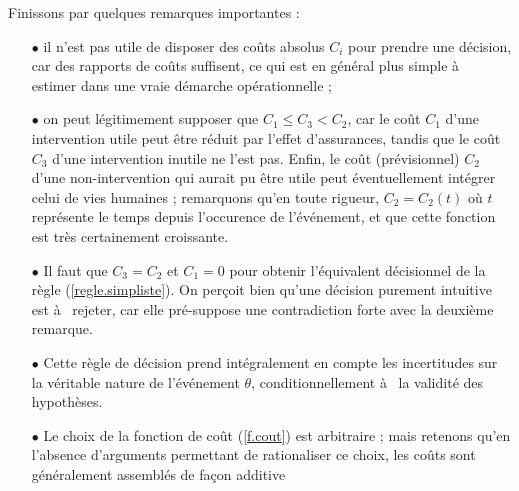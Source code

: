 

\vspace{1cm}

Finissons par quelques remarques importantes :
\begin{itemize}
\item[$\bullet$] il n'est pas utile de disposer des coûts absolus $C_i$ pour prendre une décision, car des rapports de coûts suffisent, ce qui est en général plus simple à  estimer dans une vraie démarche opérationnelle ;
\item[$\bullet$] on peut légitimement supposer que $C_1\leq  C_3 < C_2$, car le coût $C_1$ d'une intervention utile peut être réduit par l'effet d'assurances, tandis que le coût $C_3$ d'une intervention inutile ne l'est pas. Enfin, le coût (prévisionnel) $C_2$ d'une non-intervention qui aurait pu être utile peut éventuellement intégrer celui de vies humaines ; remarquons qu'en toute rigueur, $C_2=C_2(t)$ où $t$ représente le temps depuis l'occurence de l'événement, et que cette fonction est très certainement croissante. 
\item[$\bullet$] Il faut que $C_3=C_2$ et $C_1=0$ pour obtenir l'équivalent décisionnel de la règle (\ref{regle.simpliste}). On per\c coit bien qu'une décision purement intuitive est à  rejeter, car elle pré-suppose une contradiction forte avec la deuxième remarque.
\item[$\bullet$] Cette règle de décision prend intégralement en compte les incertitudes sur la véritable nature de l'événement $\theta$, conditionnellement à  la validité des hypothèses. 
\item[$\bullet$] Le choix de la fonction de coût (\ref{f.cout}) est arbitraire ; mais retenons qu'en l'absence d'arguments permettant de rationaliser ce choix, les coûts sont généralement assemblés de fa\c con additive
\end{itemize}  